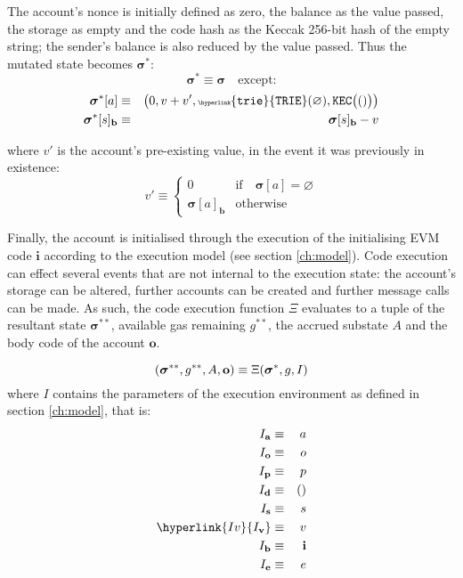 \documentclass[9pt,oneside]{amsart}
\begin{document}
\begin{multicols}{2}
The account's nonce is initially defined as zero, the balance as the value passed, the storage as empty and the code hash as the Keccak 256-bit hash of the empty string; the sender's balance is also reduced by the value passed. Thus the mutated state becomes $\boldsymbol{\sigma}^*$:
\begin{equation}
\boldsymbol{\sigma}^* \equiv \boldsymbol{\sigma} \quad \text{except:}
\end{equation}
\begin{eqnarray}
\boldsymbol{\sigma}^*[a] &\equiv& \big( 0, v + v', \mathtt{\tiny \hyperlink{trie}{TRIE}}(\varnothing), \mathtt{\tiny KEC}\big(()\big) \big) \\
\boldsymbol{\sigma}^*[s]_\mathbf{b} &\equiv& \boldsymbol{\sigma}[s]_\mathbf{b} - v
\end{eqnarray}

where $v'$ is the account's pre-existing value, in the event it was previously in existence:
\begin{equation}
v' \equiv \begin{cases}
0 & \text{if} \quad \boldsymbol{\sigma}[a] = \varnothing\\
\boldsymbol{\sigma}[a]_\mathbf{b} & \text{otherwise}
\end{cases}
\end{equation}


Finally, the account is initialised through the execution of the initialising EVM code $\mathbf{i}$ according to the execution model (see section \ref{ch:model}). Code execution can effect several events that are not internal to the execution state: the account's storage can be altered, further accounts can be created and further message calls can be made. As such, the code execution function $\Xi$ evaluates to a tuple of the resultant state $\boldsymbol{\sigma}^{**}$, available gas remaining $g^{**}$, the accrued substate $A$ and the body code of the account $\mathbf{o}$.

\begin{equation}
(\boldsymbol{\sigma}^{**}, g^{**}, A, \mathbf{o}) \equiv \Xi(\boldsymbol{\sigma}^*, g, I) \\
\end{equation}
where $I$ contains the parameters of the execution environment as defined in section \ref{ch:model}, that is:
\begin{eqnarray}
I_\mathbf{a} & \equiv & a \\
I_\mathbf{o} & \equiv & o \\
I_\mathbf{p} & \equiv & p \\
I_\mathbf{d} & \equiv & () \\
I_\mathbf{s} & \equiv & s \\
\hyperlink{I v}{I_\mathbf{v}} & \equiv & v \\
I_\mathbf{b} & \equiv & \mathbf{i} \\
I_\mathbf{e} & \equiv & e
\end{eqnarray}


\end{multicols}
\end{document}

